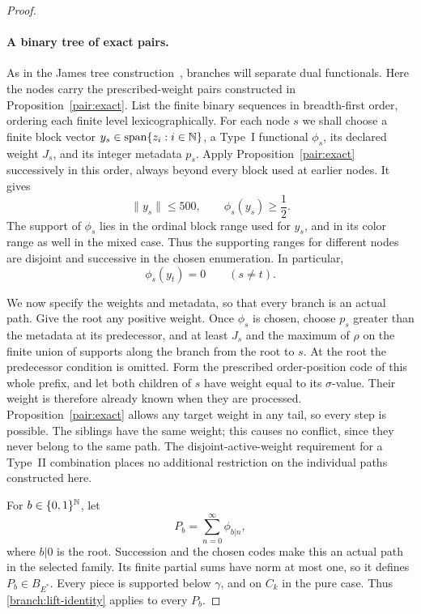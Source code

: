 \begin{proof}
\paragraph{A binary tree of exact pairs.}
As in the James tree construction~\cite{James1974}, branches will
separate dual functionals. Here the nodes carry the prescribed-weight
pairs constructed in Proposition~\ref{pair:exact}.
List the finite binary sequences in breadth-first order, ordering each
finite level lexicographically.  For each node $s$ we shall choose a
finite block vector $y_s\in\operatorname{span}\{z_i:i\in\mathbb N\}$, a
Type~I functional $\phi_s$, its declared weight $J_s$, and its integer
metadata $p_s$.  Apply Proposition~\ref{pair:exact} successively in this
order, always beyond every block used at earlier nodes.  It gives
\begin{equation}\label{branch:node-pair}
             \|y_s\|\leq500,
             \qquad \phi_s(y_s)\geq\frac12.
\end{equation}
The support of $\phi_s$ lies in the ordinal block range used for $y_s$,
and in its color range as well in the mixed case.  Thus the supporting
ranges for different nodes are disjoint and successive in the chosen
enumeration.  In particular,
\begin{equation}\label{branch:cross-evaluations}
                       \phi_s(y_t)=0\qquad(s\ne t).
\end{equation}

We now specify the weights and metadata, so that every branch is an
actual path.  Give the root any positive weight.  Once $\phi_s$ is
chosen, choose $p_s$ greater than the metadata at its predecessor, and
at least $J_s$ and the maximum of $\rho$ on the finite union of supports
along the branch from the root to $s$.  At the root the predecessor
condition is omitted.  Form the prescribed order-position code of this
whole prefix, and let both children of $s$ have weight equal to its
$\sigma$-value.  Their weight is therefore already known when they are
processed.  Proposition~\ref{pair:exact} allows any target weight in any tail,
so every step is possible.  The siblings have the same weight; this
causes no conflict, since they never belong to the same path.  The
disjoint-active-weight requirement for a Type~II combination places no
additional restriction on the individual paths constructed here.

For $b\in\{0,1\}^{\mathbb N}$, let
\[
                  P_b=\sum_{n=0}^{\infty}\phi_{b|n},
\]
where $b|0$ is the root.  Succession and the chosen codes make this an
actual path in the selected family.  Its finite partial sums have norm
at most one, so it defines $P_b\in B_{E^*}$.  Every piece is supported
below $\gamma$, and on $C_k$ in the pure case.  Thus
\eqref{branch:lift-identity} applies to every $P_b$.


\end{proof}
